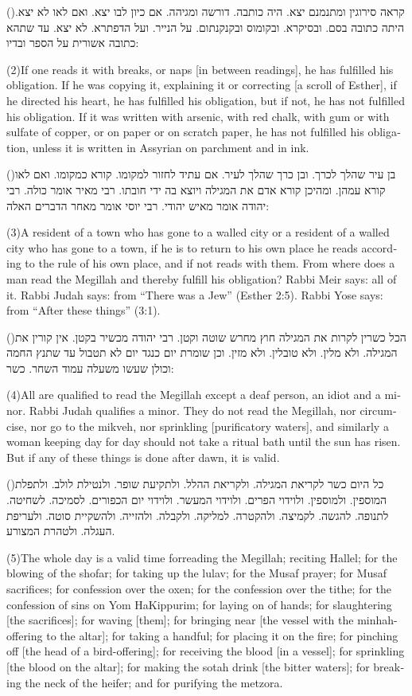 \documentclass[12pt, openany]{book}
\newcommand{\sethebfont}{
\fontsize{10.5pt}{13.1pt} \selectfont
}
\newcommand{\hebeng}[2]{
	{\sethebfont #1\\}
	
	\begin{english}
		#2
	\end{english}
	\clearpage
}
\newcommand{\vsnum}[1]{(\hebrewnumeral{#1})\space}
\newcommand{\vsnumeng}[1]{(#1)\space}
\begin{document}
\hebeng{\vsnum{2}קראה סירוגין ומתנמנם יצא. היה כותבה. דורשה ומגיהה. אם כיון לבו יצא. ואם לאו לא יצא. היתה כתובה בסם. ובסיקרא. ובקומוס ובקנקנתום. על הנייר. ועל הדפתרא. לא יצא. עד שתהא כתובה אשורית על הספר ובדיו: }{\vsnumeng{2}If one reads it with breaks, or naps {[in between readings]}, he has fulfilled his obligation. If he was copying it, explaining it or correcting {[a scroll of Esther]}, if he directed his heart, he has fulfilled his obligation, but if not, he has not fulfilled his obligation. If it was written with arsenic, with red chalk, with gum or with sulfate of copper, or on paper or on scratch paper, he has not fulfilled his obligation, unless it is written in Assyrian on parchment and in ink.}%

\hebeng{\vsnum{3}בן עיר שהלך לכרך. ובן כרך שהלך לעיר. אם עתיד לחזור למקומו. קורא כמקומו. ואם לאו קורא עמהן. ומהיכן קורא אדם את המגילה ויוצא בה ידי חובתו. רבי מאיר אומר כולה. רבי יהודה אומר מאיש יהודי. רבי יוסי אומר מאחר הדברים האלה: }{\vsnumeng{3}A resident of a town who has gone to a walled city or a resident of a walled city who has gone to a town, if he is to return to his own place he reads according to the rule of his own place, and if not reads with them. From where does a man read the Megillah and thereby fulfill his obligation? Rabbi Meir says: all of it. Rabbi Judah says: from “There was a Jew” (Esther 2:5). Rabbi Yose says: from “After these things” (3:1).}%

\hebeng{\vsnum{4}הכל כשרין לקרות את המגילה חוץ מחרש שוטה וקטן. רבי יהודה מכשיר בקטן. אין קורין את המגילה. ולא מלין. ולא טובלין. ולא מזין. וכן שומרת יום כנגד יום לא תטבול עד שתנץ החמה וכולן שעשו משעלה עמוד השחר. כשר: }{\vsnumeng{4}All are qualified to read the Megillah except a deaf person, an idiot and a minor. Rabbi Judah qualifies a minor. They do not read the Megillah, nor circumcise, nor go to the mikveh, nor sprinkling {[purificatory waters]}, and similarly a woman keeping day for day should not take a ritual bath until the sun has risen. But if any of these things is done after dawn, it is valid.}%

\hebeng{\vsnum{5}כל היום כשר לקריאת המגילה. ולקריאת ההלל. ולתקיעת שופר. ולנטילת לולב. ולתפלת המוספין. ולמוספין. ולוידוי הפרים. ולוידוי המעשר. ולוידוי יום הכפורים. לסמיכה. לשחיטה. לתנופה. להגשה. לקמיצה. ולהקטרה. למליקה. ולקבלה. ולהזייה. ולהשקיית סוטה. ולעריפת העגלה. ולטהרת המצורע. }{\vsnumeng{5}The whole day is a valid time forreading the Megillah; reciting Hallel; for the blowing of the shofar; for taking up the lulav; for the Musaf prayer; for Musaf sacrifices; for confession over the oxen; for the confession over the tithe; for the confession of sins on Yom HaKippurim; for laying on of hands; for slaughtering {[the sacrifices]}; for waving {[them]}; for bringing near {[the vessel with the minhah-offering to the altar]}; for taking a handful; for placing it on the fire; for pinching off {[the head of a bird-offering]}; for receiving the blood {[in a vessel]}; for sprinkling {[the blood on the altar]}; for making the sotah drink {[the bitter waters]}; for breaking the neck of the heifer; and for purifying the metzora.}%
\end{document}
